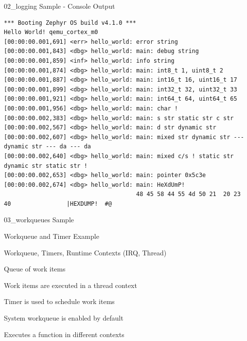 \documentclass[10pt, aspectratio=169]{beamer}
\begin{document}
\begin{frame}[fragile]{02\_logging Sample - Console Output}
  \begin{listing}[H]
    \begin{verbatim}
*** Booting Zephyr OS build v4.1.0 ***
Hello World! qemu_cortex_m0
[00:00:00.001,691] <err> hello_world: error string
[00:00:00.001,843] <dbg> hello_world: main: debug string
[00:00:00.001,859] <inf> hello_world: info string
[00:00:00.001,874] <dbg> hello_world: main: int8_t 1, uint8_t 2
[00:00:00.001,887] <dbg> hello_world: main: int16_t 16, uint16_t 17
[00:00:00.001,899] <dbg> hello_world: main: int32_t 32, uint32_t 33
[00:00:00.001,921] <dbg> hello_world: main: int64_t 64, uint64_t 65
[00:00:00.001,956] <dbg> hello_world: main: char !
[00:00:00.002,383] <dbg> hello_world: main: s str static str c str
[00:00:00.002,567] <dbg> hello_world: main: d str dynamic str
[00:00:00.002,607] <dbg> hello_world: main: mixed str dynamic str --- dynamic str --- da --- da
[00:00:00.002,640] <dbg> hello_world: main: mixed c/s ! static str dynamic str static str !
[00:00:00.002,653] <dbg> hello_world: main: pointer 0x5c3e
[00:00:00.002,674] <dbg> hello_world: main: HeXdUmP!
                                      48 45 58 44 55 4d 50 21  20 23 40                |HEXDUMP!  #@

    \end{verbatim}
  \end{listing}
\end{frame}
\begin{frame}[fragile]{03\_workqueues Sample}
      \begin{description}
	\item [Description] Workqueue and Timer Example
	\item [Learn] Workqueue, Timers, Runtime Contexts (IRQ, Thread)
	\item Queue of work items
	\item Work items are executed in a thread context
	\item Timer is used to schedule work items
	\item System workqueue is enabled by default
	\item [Sample] Executes a function in different contexts
      \end{description}
\end{frame}
\end{document}

